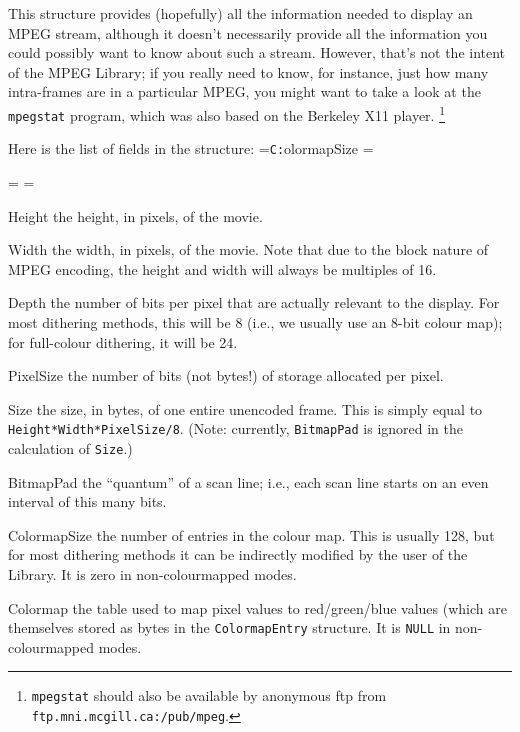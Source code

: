 \documentclass[11pt]{article}
\newcommand{\code}[1]{\texttt{#1}}
\newcommand{\ttlabel}[1]{\texttt{#1:}\quad\hfil}
\newenvironment{ttdescription}[1] {\newbox\holder
  \setbox\holder=\hbox{\ttlabel#1} \dimen0=\wd\holder
 \begin{list}{}
   {\labelsep=-0.25in \rightmargin=0.25in \leftmargin=\dimen0
     \addtolength{\leftmargin}{0.25in}
  \labelwidth=\leftmargin
  \let\makelabel\ttlabel}}%
{\end{list}}
\begin{document}
This structure provides (hopefully) all the information needed to
display an MPEG stream, although it doesn't necessarily provide all
the information you could possibly want to know about such a stream.
However, that's not the intent of the MPEG Library; if you really need
to know, for instance, just how many intra-frames are in a particular
MPEG, you might want to take a look at the \code{mpegstat} program,
which was also based on the Berkeley X11 player.%
\footnote{\code{mpegstat} should also be available by anonymous ftp
  from \code{ftp.mni.mcgill.ca:/pub/mpeg}.}

Here is the list of fields in the structure:
\begin{ttdescription}{ColormapSize}
\item[Height] the height, in pixels, of the movie.
\item[Width] the width, in pixels, of the movie.  Note that due to the
  block nature of MPEG encoding, the height and width will always be
  multiples of 16.
\item[Depth] the number of bits per pixel that are actually relevant
  to the display.  For most dithering methods, this will be 8 (i.e.,
  we usually use an 8-bit colour map); for full-colour dithering, it
  will be 24.
\item[PixelSize] the number of bits (not bytes!) of storage allocated
  per pixel.
\item[Size] the size, in bytes, of one entire unencoded frame.  This
  is simply equal to \code{Height*Width*PixelSize/8}.  (Note:
  currently, \code{BitmapPad} is ignored in the calculation of
  \code{Size}.)
\item[BitmapPad] the ``quantum'' of a scan line; i.e., each scan line
  starts on an even interval of this many bits.
\item[ColormapSize] the number of entries in the colour map.  This is
  usually 128, but for most dithering methods it can be indirectly
  modified by the user of the Library.  It is zero in non-colourmapped
  modes.
\item[Colormap] the table used to map pixel values to
  red/\-green/\-blue values (which are themselves stored as bytes in
  the \code{ColormapEntry} structure.  It is \code{NULL} in
  non-colourmapped modes.
\end{ttdescription}
\end{document}
